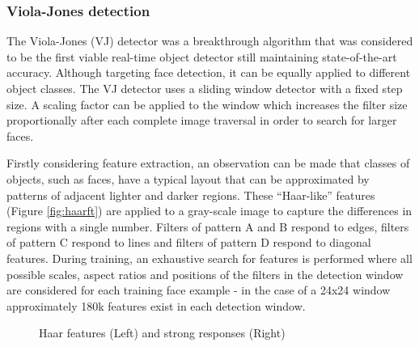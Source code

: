 \documentclass[a4paper,twoside,12pt]{report}
\begin{document}
\subsubsection{Viola-Jones detection}

The Viola-Jones (VJ) detector \cite{vjdet} was a breakthrough algorithm that was considered to be the first viable real-time object detector still maintaining state-of-the-art accuracy. Although targeting face detection, it can be equally applied to different object classes. The VJ detector uses a sliding window detector with a fixed step size. A scaling factor can be applied to the window which increases the filter size proportionally after each complete image traversal in order to search for larger faces. 

Firstly considering feature extraction, an observation can be made that classes of objects, such as faces, have a typical layout that can be approximated by patterns of adjacent lighter and darker regions. These ``Haar-like'' features (Figure \ref{fig:haarft}) are applied to a gray-scale image to capture the differences in regions with a single number. Filters of pattern A and B respond to edges, filters of pattern C respond to lines and filters of pattern D respond to diagonal features. During training, an exhaustive search for features is performed where all possible scales, aspect ratios and positions of the filters in the detection window are considered for each training face example - in the case of a 24x24 window approximately 180k features exist in each detection window. 

\begin{figure}[h!]
    \centering
    \qquad
    \caption{Haar features \cite{vjdet} (Left) and strong responses (Right)}
\end{figure}
\end{document}
